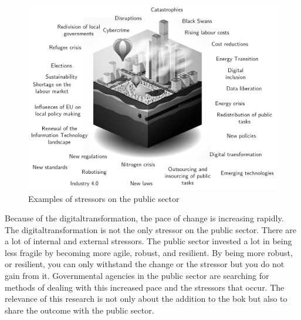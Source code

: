 \begin{figure}[H]
	\centering
	\includegraphics[width=0.8\linewidth]{images/publicstressors}
	\caption[Examples of stressors on the public sector]{Examples of stressors on the public sector}
	\label{fig:publicstressors}
\end{figure}

Because of the \gls{digitaltransformation}, the pace of change is increasing rapidly.  The \gls{digitaltransformation} is not the only stressor on the public sector. There are a lot of internal and external stressors. The public sector invested a lot in being less fragile by becoming more agile, robust, and resilient. By being more robust, or resilient, you can only withstand the change or the stressor but you do not gain from it. Governmental agencies in the public sector are searching for methods of dealing with this increased pace and the stressors that occur. The relevance of this research is not only about the addition to the \acrshort{bok} but also to share the outcome with the public sector.

